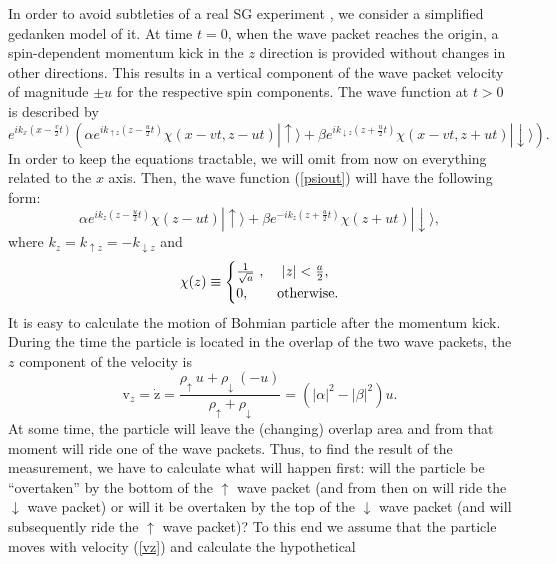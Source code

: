 \documentclass[12pt,preprint,tightenlines]{elsarticle}
\begin{document}
In order to avoid subtleties of a real SG experiment \cite{Home},
we consider a simplified gedanken model of it. At time $t=0$, when
the wave packet reaches the origin, a spin-dependent momentum kick
in the $z$ direction is provided without changes in other directions.
This results in a vertical component of the wave packet velocity of
magnitude $\pm u$ for the respective spin components. The wave function at $t>0$ is described by
\begin{equation}
e^{ik_{x}(x-\frac{v}{2}t)}\left(\alpha e^{ik_{\uparrow z}(z-\frac{u}{2}t)}\chi(x-vt,z-ut)|\uparrow\rangle+\beta e^{ik_{\downarrow z}(z+\frac{u}{2}t)}\chi(x-vt,z+ut)|\downarrow\rangle\right).\label{psiout}
\end{equation}
 In order to keep the equations tractable, we will omit from now on
everything related to the $x$ axis. Then, the wave function (\ref{psiout})
will have the following form:
 \begin{equation}
\alpha e^{ik_{z}(z-\frac{u}{2}t)}\chi(z-ut)|\uparrow\rangle+\beta e^{-ik_{z}(z+\frac{u}{2}t)}\chi(z+ut)|\downarrow\rangle,\label{psioutnox}
\end{equation}
 where $k_{z}=k_{\uparrow z}=-k_{\downarrow z}$ and
 \begin{equation}
\chi(z)\equiv\begin{cases}
\frac{1}{{\sqrt{a}}}~, & ~|z|<\frac{a}{2},\\
0, & {\rm otherwise}.\end{cases}\label{chi1}
\end{equation}
 It is easy to calculate the motion of Bohmian particle after the
momentum kick. During the time the particle is located in the overlap
of the two wave packets, the $z$ component of the velocity is
\begin{equation}
\mathrm{v}_{z}=\dot{\mathrm{z}}=\frac{{\rho_{\uparrow}~u+\rho_{\downarrow}~(-u)}}{{\rho_{\uparrow}+\rho_{\downarrow}}}=\left(|\alpha|^{2}-|\beta|^{2}\right)u.\label{vz}
\end{equation}
 At some time, the particle will leave the (changing) overlap area
and from that moment will ride one of the wave packets. Thus, to find
the result of the measurement, we have to calculate what will happen
first: will the particle be ``overtaken'' by the bottom of the
$\uparrow$ wave packet (and from then on will ride the $\downarrow$ wave packet)
or will it be overtaken by the top of the $\downarrow$ wave packet (and will
subsequently ride the $\uparrow$ wave packet)? To this end we assume that
the particle moves with velocity (\ref{vz}) and calculate the hypothetical
\end{document}
